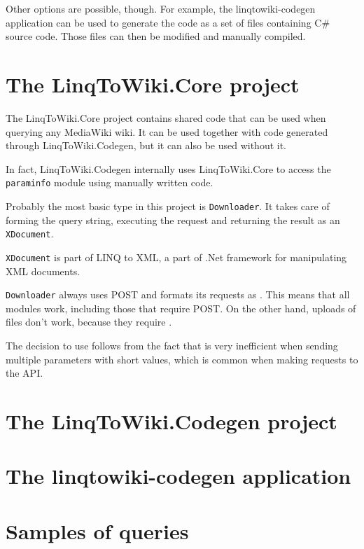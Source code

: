 Other options are possible, though.
For example, the linqtowiki-codegen application can be used to generate the code as a set of files containing C\# source code.
Those files can then be modified and manually compiled.

\section{The LinqToWiki.Core project}

The LinqToWiki.Core project contains shared code that can be used when querying any MediaWiki wiki.
It can be used together with code generated through LinqToWiki\allowbreak{}.Codegen,
but it can also be used without it.

In fact, LinqToWiki.\allowbreak{}Codegen internally uses LinqToWiki.Core to access the \texttt{paraminfo} module
using manually written code.

\medskip

Probably the most basic type in this project is \lstinline{Downloader}.
It takes care of forming the query string, executing the request and
returning the result as an \lstinline{XDocument}.

\lstinline{XDocument} is part of LINQ to XML, a part of .Net framework for manipulating XML documents.

\lstinline{Downloader} always uses POST and formats its requests as .
This means that all modules work, including those that require POST.
On the other hand, uploads of files don't work, because they require .

The decision to use  follows from the fact that
 is very inefficient when sending multiple parameters with short values,
which is common when making requests to the API.

\medskip




\section{The LinqToWiki.Codegen project}

\section{The linqtowiki-codegen application}

\section{Samples of queries}